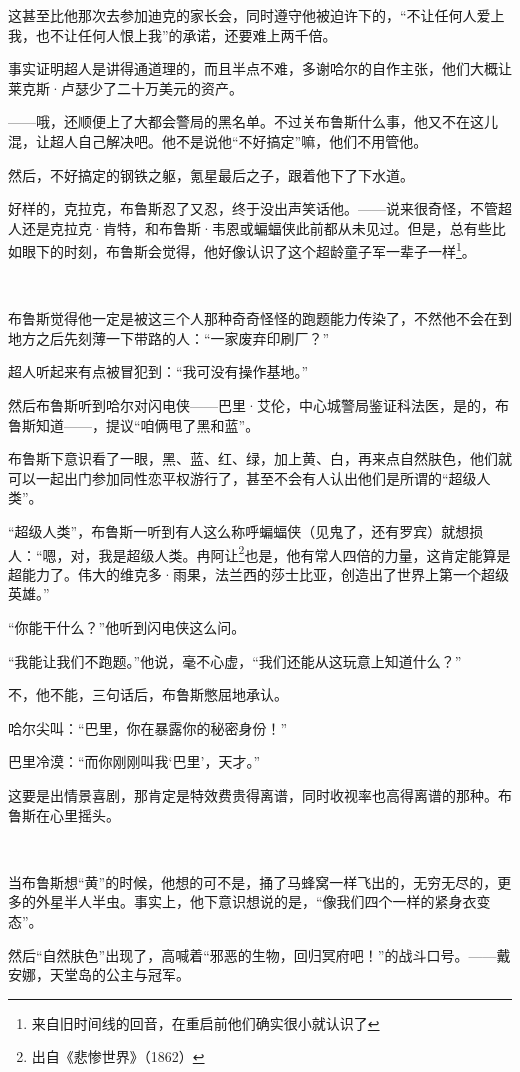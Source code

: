 \documentclass[../main]{subfiles}
\begin{document}
这甚至比他那次去参加迪克的家长会，同时遵守他被迫许下的，“不让任何人爱上我，也不让任何人恨上我”的承诺，还要难上两千倍。

事实证明超人是讲得通道理的，而且半点不难，多谢哈尔的自作主张，他们大概让莱克斯·卢瑟少了二十万美元的资产。

——哦，还顺便上了大都会警局的黑名单。不过关布鲁斯什么事，他又不在这儿混，让超人自己解决吧。他不是说他“不好搞定”嘛，他们不用管他。

然后，不好搞定的钢铁之躯，氪星最后之子，跟着他下了下水道。

好样的，克拉克，布鲁斯忍了又忍，终于没出声笑话他。——说来很奇怪，不管超人还是克拉克·肯特，和布鲁斯·韦恩或蝙蝠侠此前都从未见过。但是，总有些比如眼下的时刻，布鲁斯会觉得，他好像认识了这个超龄童子军一辈子一样\footnote[1]{来自旧时间线的回音，在重启前他们确实很小就认识了}。

~\

布鲁斯觉得他一定是被这三个人那种奇奇怪怪的跑题能力传染了，不然他不会在到地方之后先刻薄一下带路的人：“一家废弃印刷厂？”

超人听起来有点被冒犯到：“我可没有操作基地。”

然后布鲁斯听到哈尔对闪电侠——巴里·艾伦，中心城警局鉴证科法医，是的，布鲁斯知道——，提议“咱俩甩了黑和蓝”。

布鲁斯下意识看了一眼，黑、蓝、红、绿，加上黄、白，再来点自然肤色，他们就可以一起出门参加同性恋平权游行了，甚至不会有人认出他们是所谓的“超级人类”。

“超级人类”，布鲁斯一听到有人这么称呼蝙蝠侠（见鬼了，还有罗宾）就想损人：“嗯，对，我是超级人类。冉阿让\footnote[1]{出自《悲惨世界》（1862）}也是，他有常人四倍的力量，这肯定能算是超能力了。伟大的维克多·雨果，法兰西的莎士比亚，创造出了世界上第一个超级英雄。”

“你能干什么？”他听到闪电侠这么问。

“我能让我们不跑题。”他说，毫不心虚，“我们还能从这玩意上知道什么？”

不，他不能，三句话后，布鲁斯憋屈地承认。

哈尔尖叫：“巴里，你在暴露你的秘密身份！”

巴里冷漠：“而你刚刚叫我‘巴里’，天才。”

这要是出情景喜剧，那肯定是特效费贵得离谱，同时收视率也高得离谱的那种。布鲁斯在心里摇头。

~\

当布鲁斯想“黄”的时候，他想的可不是，捅了马蜂窝一样飞出的，无穷无尽的，更多的外星半人半虫。事实上，他下意识想说的是，“像我们四个一样的紧身衣变态”。

然后“自然肤色”出现了，高喊着“邪恶的生物，回归冥府吧！”的战斗口号。——戴安娜，天堂岛的公主与冠军。
\end{document}
